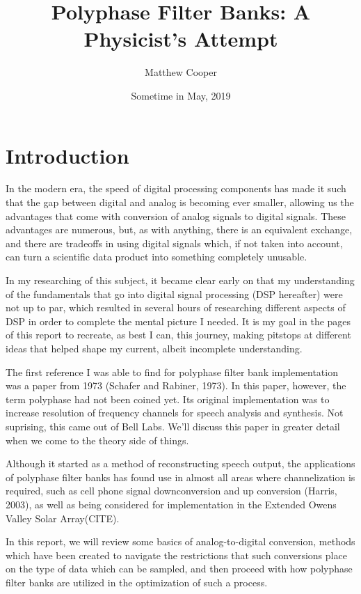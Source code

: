 \documentclass{report}
\title{Polyphase Filter Banks: A Physicist's Attempt}
\author{Matthew Cooper}
\date{Sometime in May, 2019}
\begin{document}
\maketitle

\tableofcontents{}

\newpage
\chapter{Introduction}

In the modern era, the speed of digital processing components has made it such that the gap between digital and analog is becoming ever smaller, allowing us the advantages that come with conversion of analog signals to digital signals.  These advantages are numerous, but, as with anything, there is an equivalent exchange, and there are tradeoffs in using digital signals which, if not taken into account, can turn a scientific data product into something completely unusable.

In my researching of this subject, it became clear early on that my understanding of the fundamentals that go into digital signal processing (DSP hereafter) were not up to par, which resulted in several hours of researching different aspects of DSP in order to complete the mental picture I needed.  It is my goal in the pages of this report to recreate, as best I can, this journey, making pitstops at different ideas that helped shape my current, albeit incomplete understanding.  

The first reference I was able to find for polyphase filter bank implementation was a paper from 1973 (Schafer and Rabiner, 1973).  In this paper, however, the term polyphase had not been coined yet.  Its original implementation was to increase resolution of frequency channels for speech analysis and synthesis.  Not suprising, this came out of Bell Labs.  We'll discuss this paper in greater detail when we come to the theory side of things.

Although it started as a method of reconstructing speech output, the applications of polyphase filter banks has found use in almost all areas where channelization is required, such as cell phone signal downconversion and up conversion (Harris, 2003), as well as being considered for implementation in the Extended Owens Valley Solar Array(CITE).  

In this report, we will review some basics of analog-to-digital conversion, methods which have been created to navigate the restrictions that such conversions place on the type of data which can be sampled, and then proceed with how polyphase filter banks are utilized in the optimization of such a process.  
\end{document}
